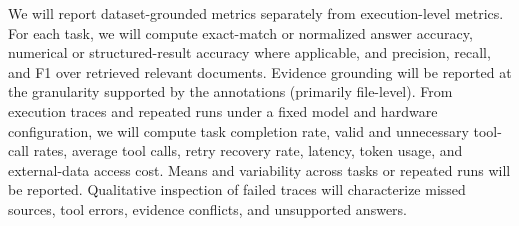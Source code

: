 \documentclass{article}
\begin{document}
We will report dataset-grounded metrics separately from execution-level metrics. For each task, we will compute exact-match or normalized answer accuracy, numerical or structured-result accuracy where applicable, and precision, recall, and F1 over retrieved relevant documents. Evidence grounding will be reported at the granularity supported by the annotations (primarily file-level). From execution traces and repeated runs under a fixed model and hardware configuration, we will compute task completion rate, valid and unnecessary tool-call rates, average tool calls, retry recovery rate, latency, token usage, and external-data access cost. Means and variability across tasks or repeated runs will be reported. Qualitative inspection of failed traces will characterize missed sources, tool errors, evidence conflicts, and unsupported answers.
\end{document}
